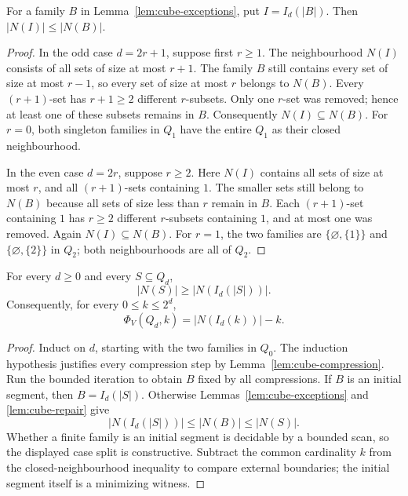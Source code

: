 \begin{lemma}
\label{lem:cube-repair}
For a family \(B\) in Lemma~\ref{lem:cube-exceptions}, put
\(I=I_d(|B|)\).  Then \(|N(I)|\leq |N(B)|\).
\end{lemma}
\begin{proof}
In the odd case \(d=2r+1\), suppose first \(r\geq1\).
The neighbourhood \(N(I)\) consists of all sets of size at most \(r+1\).
The family \(B\) still contains every set of size at most \(r-1\),
so every set of size at most \(r\) belongs to \(N(B)\).
Every \((r+1)\)-set has \(r+1\geq2\) different \(r\)-subsets.
Only one \(r\)-set was removed; hence at least one of these subsets
remains in \(B\).  Consequently \(N(I)\subseteq N(B)\).
For \(r=0\), both singleton families in \(Q_1\) have the entire
\(Q_1\) as their closed neighbourhood.

In the even case \(d=2r\), suppose \(r\geq2\).
Here \(N(I)\) contains all sets of size at most \(r\), and all
\((r+1)\)-sets containing \(1\).  The smaller sets still belong to
\(N(B)\) because all sets of size less than \(r\) remain in \(B\).
Each \((r+1)\)-set containing \(1\) has \(r\geq2\) different
\(r\)-subsets containing \(1\), and at most one was removed.
Again \(N(I)\subseteq N(B)\).
For \(r=1\), the two families are \(\{\varnothing,\{1\}\}\)
and \(\{\varnothing,\{2\}\}\) in \(Q_2\); both neighbourhoods
are all of \(Q_2\).
\end{proof}

\begin{theorem}\label{thm:cube-harper}
For every \(d\geq0\) and every \(S\subseteq Q_d\),
\begin{equation}\label{eq:cube-harper}
 |N(S)|\geq |N(I_d(|S|))|.
\end{equation}
Consequently, for every \(0\leq k\leq2^d\),
\[
 \Phi_V(Q_d,k)=|N(I_d(k))|-k.
\]
\end{theorem}
\begin{proof}
Induct on \(d\), starting with the two families in \(Q_0\).
The induction hypothesis justifies every compression step by
Lemma~\ref{lem:cube-compression}.  Run the bounded iteration to obtain
\(B\) fixed by all compressions.  If \(B\) is an initial segment,
then \(B=I_d(|S|)\).  Otherwise
Lemmas~\ref{lem:cube-exceptions} and \ref{lem:cube-repair} give
\[
 |N(I_d(|S|))|\leq|N(B)|\leq|N(S)|.
\]
Whether a finite family is an initial segment is decidable by a bounded
scan, so the displayed case split is constructive.
Subtract the common cardinality \(k\) from the closed-neighbourhood
inequality to compare external boundaries; the initial segment itself
is a minimizing witness.
\end{proof}

